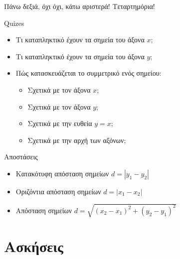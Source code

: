 \documentclass{../../presentation}
\begin{document}
\begin{frame}{Πάνω δεξιά, όχι όχι, κάτω αριστερά!}
  Τεταρτημόρια!
  \begin{center}
  \end{center}
\end{frame}

\begin{frame}{Quizes}
  \begin{itemize}[<+->]
    \item Τι καταπληκτικό έχουν τα σημεία του άξονα $x$;
    \item Τι καταπληκτικό έχουν τα σημεία του άξονα $y$;
    \item Πώς κατασκευάζεται το συμμετρικό ενός σημείου:
          \begin{itemize}[<+->]
            \item Σχετικά με τον άξονα $x$;
            \item Σχετικά με τον άξονα $y$;
            \item Σχετικά με την ευθεία $y=x$;
            \item Σχετικά με την αρχή των αξόνων;
          \end{itemize}
  \end{itemize}
\end{frame}

\begin{frame}{Αποστάσεις}
  \begin{itemize}[<+->]
    \item Κατακότυφη απόσταση σημείων  $d=|y_1-y_2|$
    \item Οριζόντια απόσταση σημείων  $d=|x_1-x_2|$
    \item Απόσταση σημείων  $d=\sqrt{(x_2-x_1)^2+(y_2-y_1)^2}$
  \end{itemize}
\end{frame}

\moodle

\section{Ασκήσεις}
\end{document}
